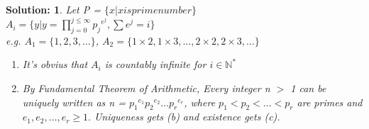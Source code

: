 \documentclass{article}
\theoremstyle{break}
\newtheorem*{solution*}{\textbf{Solution:} }
\begin{document}
\begin{enumerate}
        \begin{solution*}
            Let P = $\{x | x is prime number \}$\\
            $A_i = \{y| y=\prod_{j=0}^{j \leq \infty} {p_{j}}^{e^j}, \sum{e^j} = i\}$\\
            e.g. $A_1 = \{1, 2, 3, \dots\}$, $A_2 = \{1\times2, 1\times3, \dots, 2 \times 2, 2 \times 3, \dots\}$\\
            \begin{enumerate}[(1)]
                \item It's obvius that $A_i$ is countably infinite for $i \in \mathbb{N}^*$
                \item By Fundamental Theorem of Arithmetic, Every integer n $>$ 1 can be uniquely written as n = ${p_1}^{e_1}{p_2}^{e_2}\dots{p_r}^{e_r}$, where $p_1< p_2 < \dots < p_r $ are primes and $e_1, e_2, \dots , e_r \geq 1.$ Uniqueness gets (b) and existence gets (c).\\
                
            \end{enumerate}
\
        \end{solution*}
    \end{enumerate}
\end{document}
